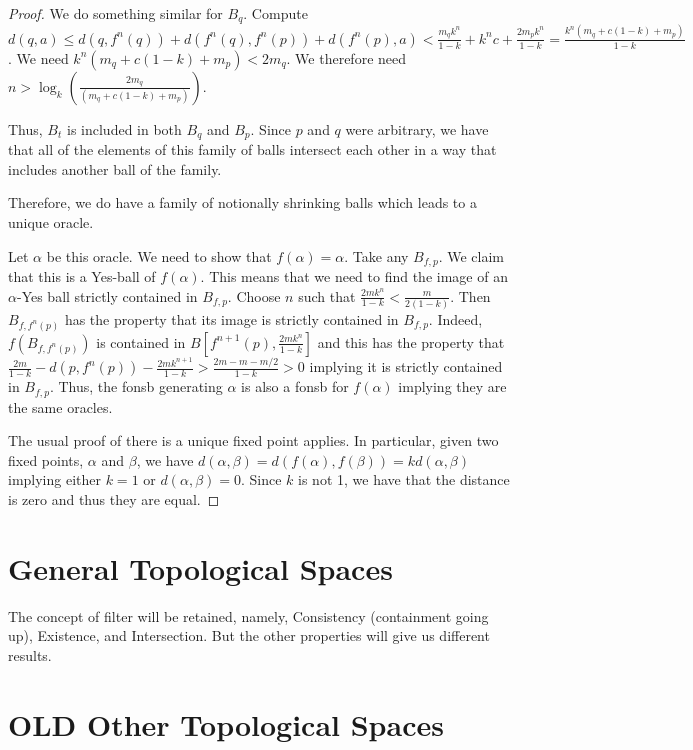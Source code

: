 \documentclass[12pt]{article}
\begin{document}
\begin{proof}
    We do something similar for $B_q$. Compute $d(q,a) \leq d(q, f^n(q)) + d(f^n(q), f^n(p)) + d(f^n(p), a) < \frac{m_q k^n}{1-k} + k^n c + \frac{2m_p k^n}{1-k} = \frac{ k^n (m_q + c(1 - k) + m_p)}{1-k}$. We need $k^n (m_q + c(1-k) + m_p) < 2 m_q $. We therefore need $n > \log_k (\frac{2 m_q}{(m_q + c(1-k) + m_p)})$.

    Thus, $B_t$ is included in both $B_q$ and $B_p$. Since $p$ and $q$ were arbitrary, we have that all of the elements of this family of balls intersect each other in a way that includes another ball of the family. 

    Therefore, we do have a family of notionally shrinking balls which leads to a unique oracle. 

    Let $\alpha$ be this oracle. We need to show that $f(\alpha) = \alpha$. Take any $B_{f,p}$. We claim that this is a Yes-ball of $f(\alpha)$.  This means that we need to find the image of an $\alpha$-Yes ball strictly contained in $B_{f,p}$. Choose $n$ such that $\frac{2mk^n}{1-k} < \frac{m}{2(1-k)}$. Then $B_{f, f^n(p)}$ has the property that its image is strictly contained in $B_{f, p}$. Indeed, $f( B_{f, f^n(p)})$ is contained in $B[f^{n+1}(p), \frac{2mk^n}{1-k}]$ and this has the property that $\frac{2m}{1-k} - d(p, f^n(p)) - \frac{2mk^{n+1}}{1-k} > \frac{2m - m - m/2}{1-k} > 0$ implying it is strictly contained in $B_{f,p}$. Thus, the fonsb generating $\alpha$ is also a fonsb for $f(\alpha)$ implying they are the same oracles. 

    The usual proof of there is a unique fixed point applies. In particular, given two fixed points, $\alpha$ and $\beta$, we have $d(\alpha, \beta) = d(f (\alpha), f(\beta)) = k d(\alpha, \beta)$ implying either $k=1$ or $d(\alpha, \beta) = 0$.  Since $k$ is not 1, we have that the distance is zero and thus they are equal. 
    
\end{proof}


\section{General Topological Spaces}

The concept of filter will be retained, namely, Consistency (containment going up), Existence, and Intersection. But the other properties will give us different results. 




\section{OLD Other Topological Spaces}
\end{document}
